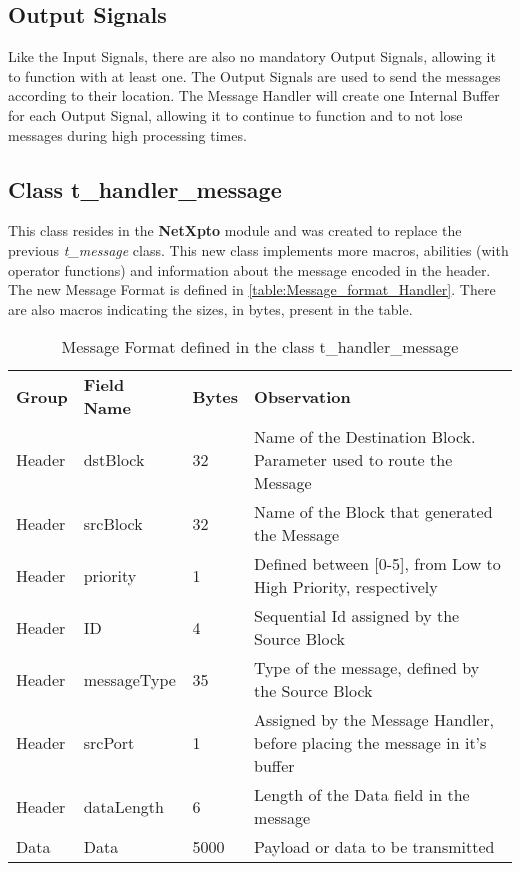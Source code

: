 \begin{refsection}
\subsection{Output Signals}
Like the Input Signals, there are also no mandatory Output Signals, allowing it 
to function with at least one. The Output Signals are used to send the messages 
according to their location. The Message Handler will create one Internal 
Buffer for each Output Signal, allowing it to continue to function and to not 
lose messages during high processing times.

\subsection{Class t\_handler\_message}
\label{lib:t_handler_message}

This class resides in the \textbf{NetXpto} module and was created to replace the previous 
\textit{t\_message} class. This new class implements more macros, abilities (with operator 
functions) and information about the message encoded in the header. 
\\
The new Message Format is defined in \autoref{table:Message_format_Handler}. 
There are also macros indicating the sizes, in bytes, present in the table.
\\
\begin{table}[H]
	\centering
	\begin{tabular}{|m{}|m{}|m{}|m{}|}
		\cline{1-4}
		\textbf{Group} & \textbf{Field Name} & \textbf{Bytes} & \textbf{Observation}\\ \cline{1-4}
		Header & dstBlock & 32 & Name of the Destination Block. Parameter used to route the Message \\ \cline{1-4}
		Header & srcBlock & 32 & Name of the Block that generated the Message \\ \cline{1-4}
		Header & priority & 1 & Defined between [0-5], from Low to High Priority, respectively\\ \cline{1-4}
		Header & ID & 4 & Sequential Id assigned by the Source Block \\ \cline{1-4}
		Header & messageType & 35 & Type of the message, defined by the Source Block \\ \cline{1-4}
		Header & srcPort & 1 & Assigned by the Message Handler, before placing the message in it's buffer \\ \cline{1-4}
		Header & dataLength & 6 & Length of the Data field in the message \\ \cline{1-4}
		Data & Data & 5000 & Payload or data to be transmitted \\ \cline{1-4}
	\end{tabular}
	\caption{Message Format defined in the class t\_handler\_message}
	\label{table:Message_format_Handler}
\end{table}


\end{refsection}
